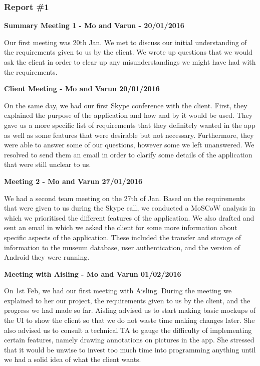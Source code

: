 \documentclass[12pt]{article}
\begin{document}
\subsubsection{Report \#1}
 \textbf{Summary Meeting 1 - Mo and Varun - 20/01/2016} 
\par
	Our first meeting was 20th Jan. We met to discuss our initial understanding of the requirements given to us by the client. We wrote up questions that we would ask the client in order to clear up any misunderstandings we might have had with the requirements. 
\par
\bigskip	
	\textbf{Client Meeting - Mo and Varun 20/01/2016}
\par
On the same day, we had our first Skype conference with the client. First, they explained the purpose of the application and how and by it would be used. They gave us a more specific list of requirements that they definitely wanted in the app as well as some features that were desirable but not necessary. Furthermore, they were able to answer some of our questions, however some we left unanswered. We resolved to send them an email in order to clarify some details of the application that were still unclear to us. 
\par
\bigskip	
	\textbf{Meeting 2 - Mo and Varun 27/01/2016}
\par
	We had a second team meeting on the 27th of Jan. Based on the requirements that were given to us during the Skype call, we conducted a MoSCoW analysis in which we prioritised the different features of the application. We also drafted and sent an email in which we asked the client for some more information about specific aspects of the application. These included the transfer and storage of information to the museum database, user authentication, and the version of Android they were running. 
\par
\bigskip	
	\textbf{Meeting with Aisling - Mo and Varun 01/02/2016} 
\par
	On 1st Feb, we had our first meeting with Aisling. During the meeting we explained to her our project, the requirements given to us by the client, and the progress we had made so far. Aisling advised us to start making basic mockups of the UI to show the client so that we do not waste time making changes later. She also advised us to consult a technical TA to gauge the difficulty of implementing certain features, namely drawing annotations on pictures in the app. She stressed that it would be unwise to invest too much time into programming anything until we had a solid idea of what the client wants.
\end{document}
